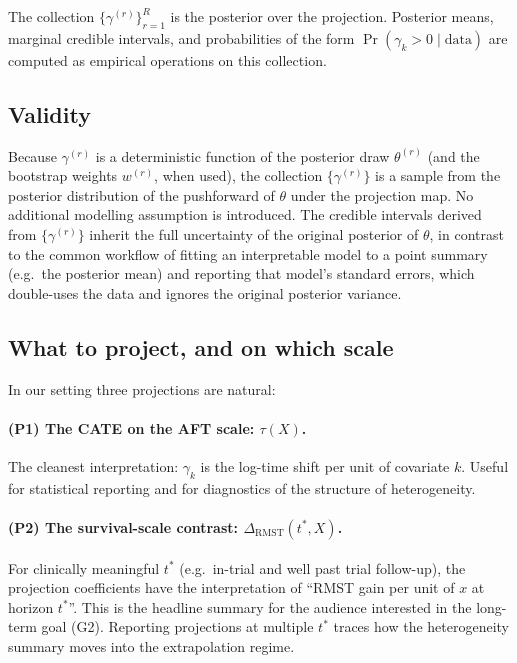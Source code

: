\documentclass[11pt]{article}
\theoremstyle{plain}
\theoremstyle{definition}
\theoremstyle{remark}
\newcommand{\1}{\mathds{1}}
\newcommand{\X}{X}
\newcommand{\tauf}{\tau}
\newcommand{\RMST}{\mathrm{RMST}}
\begin{document}
The collection $\{\gamma^{(r)}\}_{r=1}^{R}$ is the posterior over the
projection. Posterior means, marginal credible intervals, and probabilities
of the form $\Pr(\gamma_{k} > 0 \mid \text{data})$ are computed as empirical
operations on this collection.

\subsection{Validity}

Because $\gamma^{(r)}$ is a deterministic function of the posterior draw
$\theta^{(r)}$ (and the bootstrap weights $w^{(r)}$, when used), the
collection $\{\gamma^{(r)}\}$ is a sample from the posterior distribution of
the pushforward of $\theta$ under the projection map. No additional
modelling assumption is introduced. The credible intervals derived from
$\{\gamma^{(r)}\}$ inherit the full uncertainty of the original posterior
of $\theta$, in contrast to the common workflow of fitting an interpretable
model to a point summary (e.g.\ the posterior mean) and reporting that
model's standard errors, which double-uses the data and ignores the
original posterior variance.

\subsection{What to project, and on which scale}

In our setting three projections are natural:

\paragraph{(P1) The CATE on the AFT scale: $\tauf(\X)$.}
The cleanest interpretation: $\gamma_{k}$ is the log-time shift per unit of
covariate $k$. Useful for statistical reporting and for diagnostics of the
structure of heterogeneity.

\paragraph{(P2) The survival-scale contrast: $\Delta_{\RMST}(t^{*}, \X)$.}
For clinically meaningful $t^{*}$ (e.g.\ in-trial and well past trial
follow-up), the projection coefficients have the interpretation of
``RMST gain per unit of $x$ at horizon $t^{*}$''. This is the headline
summary for the audience interested in the long-term goal (G2). Reporting
projections at multiple $t^{*}$ traces how the heterogeneity summary moves
into the extrapolation regime.
\end{document}
